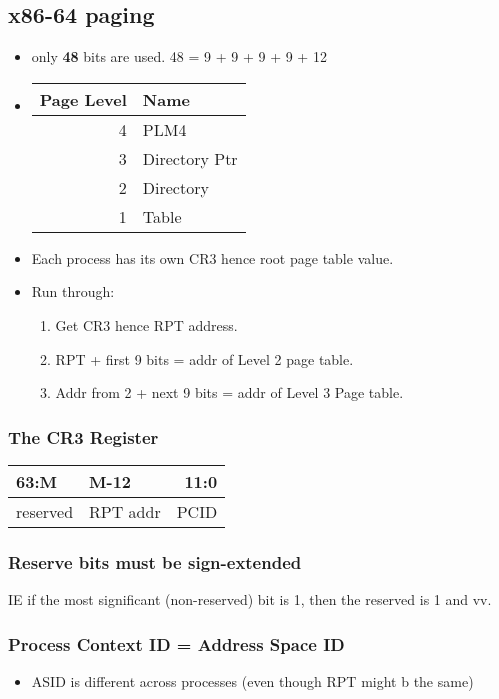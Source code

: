 \documentclass[11pt]{article}
\begin{document}
\subsection{x86-64 paging}
\label{sec:org543a478}
\begin{itemize}
\item only \textbf{48} bits are used. 48 = 9 + 9 + 9 + 9 + 12
\item \begin{center}
\begin{tabular}{rl}
Page Level & Name\\
\hline
4 & PLM4\\
3 & Directory Ptr\\
2 & Directory\\
1 & Table\\
\end{tabular}
\end{center}
\item Each process has its own CR3 hence root page table value.
\item Run through:
\begin{enumerate}
\item Get CR3 hence RPT address.
\item RPT + first 9 bits = addr of Level 2 page table.
\item Addr from 2 + next 9 bits = addr of Level 3 Page table.
\end{enumerate}
\end{itemize}
\subsubsection{The CR3 Register}
\label{sec:orga3b70f7}
\begin{center}
\begin{tabular}{llr}
63:M & M-12 & 11:0\\
\hline
reserved & RPT addr & PCID\\
\end{tabular}
\end{center}
\subsubsection{Reserve bits must be sign-extended}
\label{sec:org872a8f6}
IE if the most significant (non-reserved) bit is 1, then the reserved is 1 and vv.
\subsubsection{Process Context ID = Address Space ID}
\label{sec:orgf6190e4}
\begin{itemize}
\item ASID is different across processes (even though RPT might b the same)
\end{itemize}
\end{document}
